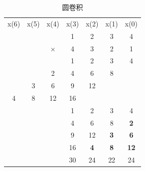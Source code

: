\documentclass{ctexart}
\newlength{\Oldarrayrulewidth}
\newcommand{\Hline}[1]{
  \noalign{\global\setlength{\Oldarrayrulewidth}{\arrayrulewidth}}
  \noalign{\global\setlength{\arrayrulewidth}{#1}}\hline
  \noalign{\global\setlength{\arrayrulewidth}{\Oldarrayrulewidth}}}
\newcommand{\Midline}{\Hline{0.05em}}
\begin{document}
    \begin{table}[ht!]
        \centering
        \begin{tabular}{*{7}{c}}
        x(6) & x(5) & x(4)     & x(3) & x(2)        & x(1)        & x(0)         \\
        \Midline
             &      &          & 1    & 2           & 3           & 4            \\
             &      & $\times$ & 4    & 3           & 2           & 1            \\
        \Midline
             &      &          & 1    & 2           & 3           & 4            \\
             &      & 2        & 4    & 6           & 8           &              \\
             & 3    & 6        & 9    & 12          &             &              \\
        4    & 8    & 12       & 16   &             &             &              \\
        \Midline
             &      &          & 1    & 2           & 3           & 4            \\
             &      &          & 4    & 6           & 8           & \bfseries 2  \\
             &      &          & 9    & 12          & \bfseries 3 & \bfseries 6  \\
             &      &          & 16   & \bfseries 4 & \bfseries 8 & \bfseries 12 \\
        \Midline
             &      &          & 30   & 24          & 22          & 24           \\
        \end{tabular}
        \caption{圆卷积}
    \end{table}
\end{document}
